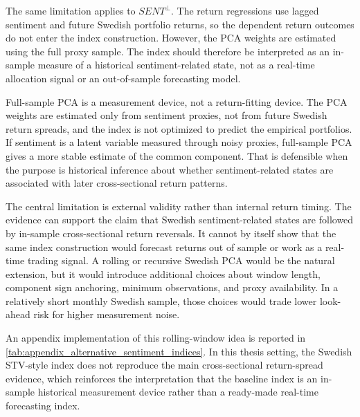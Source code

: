\documentclass[11pt]{article}
\newcommand{\var}[1]{\ensuremath{#1}}
\begin{document}
The same limitation applies to \var{SENT^{\perp}}. The return regressions use lagged sentiment and future Swedish portfolio returns, so the dependent return outcomes do not enter the index construction. However, the PCA weights are estimated using the full proxy sample. The index should therefore be interpreted as an in-sample measure of a historical sentiment-related state, not as a real-time allocation signal or an out-of-sample forecasting model.

Full-sample PCA is a measurement device, not a return-fitting device. The PCA weights are estimated only from sentiment proxies, not from future Swedish return spreads, and the index is not optimized to predict the empirical portfolios. If sentiment is a latent variable measured through noisy proxies, full-sample PCA gives a more stable estimate of the common component. That is defensible when the purpose is historical inference about whether sentiment-related states are associated with later cross-sectional return patterns.

The central limitation is external validity rather than internal return timing. The evidence can support the claim that Swedish sentiment-related states are followed by in-sample cross-sectional return reversals. It cannot by itself show that the same index construction would forecast returns out of sample or work as a real-time trading signal. A rolling or recursive Swedish PCA would be the natural extension, but it would introduce additional choices about window length, component sign anchoring, minimum observations, and proxy availability. In a relatively short monthly Swedish sample, those choices would trade lower look-ahead risk for higher measurement noise.

An appendix implementation of this rolling-window idea is reported in \cref{tab:appendix_alternative_sentiment_indices}. In this thesis setting, the Swedish STV-style index does not reproduce the main cross-sectional return-spread evidence, which reinforces the interpretation that the baseline index is an in-sample historical measurement device rather than a ready-made real-time forecasting index.
\end{document}
